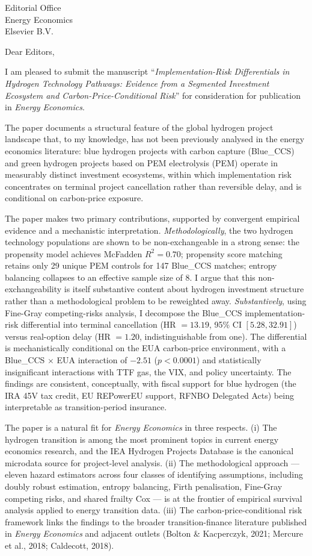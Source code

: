 \documentclass[11pt,a4paper]{letter}
\begin{document}
\begin{letter}{Editorial Office \\ Energy Economics \\ Elsevier B.V.}

\opening{Dear Editors,}

I am pleased to submit the manuscript ``\emph{Implementation-Risk Differentials in Hydrogen Technology Pathways: Evidence from a Segmented Investment Ecosystem and Carbon-Price-Conditional Risk}'' for consideration for publication in \emph{Energy Economics}.

The paper documents a structural feature of the global hydrogen project landscape that, to my knowledge, has not been previously analysed in the energy economics literature: blue hydrogen projects with carbon capture (Blue\_CCS) and green hydrogen projects based on PEM electrolysis (PEM) operate in measurably distinct investment ecosystems, within which implementation risk concentrates on terminal project cancellation rather than reversible delay, and is conditional on carbon-price exposure.

The paper makes two primary contributions, supported by convergent empirical evidence and a mechanistic interpretation. \emph{Methodologically}, the two hydrogen technology populations are shown to be non-exchangeable in a strong sense: the propensity model achieves McFadden $R^2 = 0.70$; propensity score matching retains only 29 unique PEM controls for 147 Blue\_CCS matches; entropy balancing collapses to an effective sample size of 8. I argue that this non-exchangeability is itself substantive content about hydrogen investment structure rather than a methodological problem to be reweighted away. \emph{Substantively}, using Fine-Gray competing-risks analysis, I decompose the Blue\_CCS implementation-risk differential into terminal cancellation (HR $= 13.19$, 95\% CI $[5.28, 32.91]$) versus real-option delay (HR $= 1.20$, indistinguishable from one). The differential is mechanistically conditional on the EUA carbon-price environment, with a Blue\_CCS $\times$ EUA interaction of $-2.51$ ($p < 0.0001$) and statistically insignificant interactions with TTF gas, the VIX, and policy uncertainty. The findings are consistent, conceptually, with fiscal support for blue hydrogen (the IRA 45V tax credit, EU REPowerEU support, RFNBO Delegated Acts) being interpretable as transition-period insurance.

The paper is a natural fit for \emph{Energy Economics} in three respects. (i) The hydrogen transition is among the most prominent topics in current energy economics research, and the IEA Hydrogen Projects Database is the canonical microdata source for project-level analysis. (ii) The methodological approach --- eleven hazard estimators across four classes of identifying assumptions, including doubly robust estimation, entropy balancing, Firth penalisation, Fine-Gray competing risks, and shared frailty Cox --- is at the frontier of empirical survival analysis applied to energy transition data. (iii) The carbon-price-conditional risk framework links the findings to the broader transition-finance literature published in \emph{Energy Economics} and adjacent outlets (Bolton \& Kacperczyk, 2021; Mercure et al., 2018; Caldecott, 2018).


\end{letter}
\end{document}
